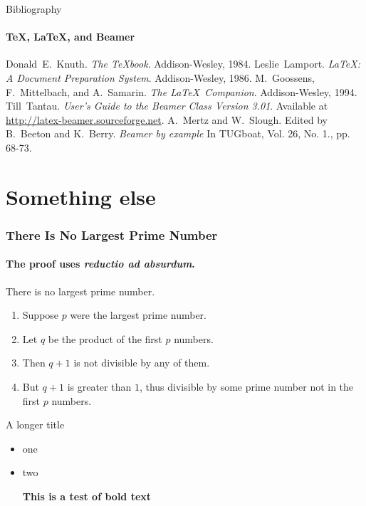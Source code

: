\documentclass[aspectratio=169]{beamer}
\begin{document}
    \begin{frame}[label=bibliography]{Bibliography}
      \framesubtitle{\TeX, \LaTeX, and Beamer}
      \begin{thebibliography}{9}
      		
            Donald~E.~Knuth.
            \emph{The \TeX book}.
            Addison-Wesley, 1984.
            Leslie~Lamport.
            \emph{\LaTeX : A Document Preparation System}.
            Addison-Wesley, 1986.
            M.~Goossens, F.~Mittelbach, and A.~Samarin.
            \emph{The \LaTeX\ Companion}.
            Addison-Wesley, 1994.
            Till~Tantau.
            \emph{User's Guide to the Beamer Class Version 3.01}.
            Available at \url{http://latex-beamer.sourceforge.net}.
            A.~Mertz and W.~Slough.
            Edited by B.~Beeton and K.~Berry.
            \emph{Beamer by example} In TUGboat,
              Vol. 26, No. 1., pp. 68-73.
      \end{thebibliography}
    \end{frame}


\section{Something else}

\begin{frame}
\frametitle{There Is No Largest Prime Number}
\framesubtitle{The proof uses \textit{reductio ad absurdum}.}
\begin{theorem}
There is no largest prime number. \end{theorem}
\begin{enumerate}
\item<1-| alert@1> Suppose $p$ were the largest prime number.
\item<2-> Let $q$ be the product of the first $p$ numbers.
\item<3-> Then $q+1$ is not divisible by any of them.
\item<1-> But $q + 1$ is greater than $1$, thus divisible by some prime
number not in the first $p$ numbers.
\end{enumerate}
\end{frame}

\begin{frame}{A longer title}
\begin{itemize}
\item one
\item two

\textbf{This is a test of bold text}

\end{itemize}
\end{frame}
\end{document}
